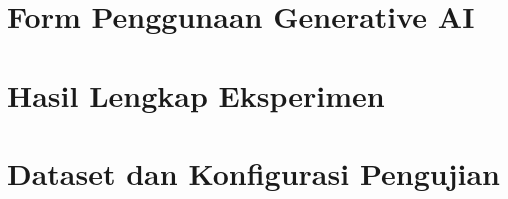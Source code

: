 \appendix
\clearpage
\section{Form Penggunaan Generative AI}

\section{Hasil Lengkap Eksperimen}

\section{Dataset dan Konfigurasi Pengujian}
